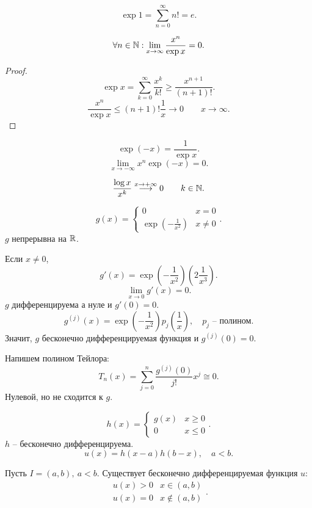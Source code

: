 \documentclass[11pt]{book}
\begin{document}
\begin{note}
    \[
	\exp 1 = \sum_{n=0}^{\infty} n! = e
    .\]
\end{note}
\begin{cor}
    \[
	\forall n \in  \mathbb{N} : \lim_{x \to  \infty}  \frac{x^{n}}{\exp x} = 0
    .\]
\end{cor}
\begin{proof}
    \[
	\exp x = \sum_{k =0}^{\infty} \frac{x^{k}}{k!}\ge  \frac{x^{n+1}}{(n+1)!}
    .\]
    \[
	\frac{x^{n}}{\exp x} \le  (n+1)! \frac{1}{x} \longrightarrow 0 \qquad x \to  \infty
    .\]
\end{proof}
\begin{note}
    \[
	\exp(-x) = \frac{1}{\exp x}
    .\]
    \[
	\lim_{x \to  -\infty}  x^{n} \exp (-x) = 0
    .\]
\end{note}
\begin{cor}
    \[
	\frac{\log x}{x^{k}} \stackrel{ x \to  + \infty}{\longrightarrow} 0 \qquad k \in  \mathbb{N}
    .\]
\end{cor}
\begin{ex}
    \[
	g(x) = \left\{
	    \begin{array}{ll}
		0 & x = 0 \\
		\exp\left(-\frac{1}{x^2}\right) & x \ne 0
	\end{array}\right.
    .\]
    $ g $ непрерывна на $ \mathbb{R}$.

    Если $ x \ne 0$, \[
	g'(x) = \exp\left(-\frac{1}{x^2} \right)\left(2 \frac{1}{x^3}\right)
    .\]
    \[
	\lim_{x \to  0}  g'(x) = 0
    .\]
    $ g$  дифференцируема а нуле и $ g'(0) = 0$.
    \[
	g^{(j)} (x) = \exp\left(-\frac{1}{x^2}\right) p_j\left(\frac{1}{x}\right), \quad p_j \text{ -- полином}
    .\]
    Значит, $ g$ бесконечно дифференцируемая функция и $ g^{(j)} (0) = 0$.


    Напишем полином Тейлора:
    \[
	T_n(x) =\sum_{j=0}^{n} \frac{g^{(j)} (0)}{j!}x^{j} \cong 0
    .\]
    Нулевой, но не сходится к $ g$.

    \[
	h(x) = \left \{
	    \begin{array}{ll}
		g(x) & x \ge  0\\
		0 & x \le 0
	    \end{array}
	\right .
    .\]
    $ h$ -- бесконечно дифференцируема.
    \[
	u(x) = h(x-a) h(b-x), \quad a<b
    .\]
\end{ex}
\begin{cor}
    Пусть $ I = (a, b), ~ a< b$. Существует бесконечно дифференцируемая функция $ u:$
    \[
	\begin{array}{ll}
	    u(x) >0 & x \in  (a, b) \\
	    u(x) = 0 & x \not\in (a,b)
	\end{array}
    .\]
\end{cor}
\end{document}
